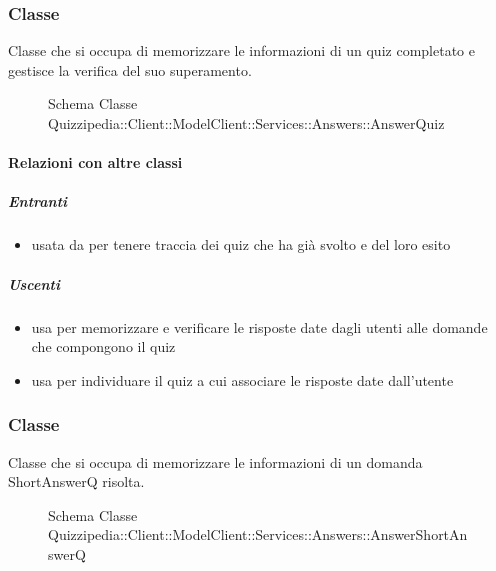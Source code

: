 \subsubsection{Classe }
Classe che si occupa di memorizzare le informazioni di un quiz completato e gestisce la verifica del suo superamento.
\begin{figure}[H]
\centering
\noindent{}
\caption[Schema Classe AnswerQuiz]{Schema Classe Quizzipedia::Client::ModelClient::Services::Answers::AnswerQuiz}
\end{figure}
\paragraph{Relazioni con altre classi}
\subparagraph{Entranti}
\begin{itemize}
\item usata da  per tenere traccia dei quiz che ha già svolto e del loro esito
\end{itemize}
\subparagraph{Uscenti}
\begin{itemize}
\item usa  per memorizzare e verificare le risposte date dagli utenti alle domande che compongono il quiz
\item usa  per individuare il quiz a cui associare le risposte date dall'utente
\end{itemize}
\subsubsection{Classe }
Classe che si occupa di memorizzare le informazioni di un domanda ShortAnswerQ risolta.
\begin{figure}[H]
\centering
\noindent{}
\caption[Schema Classe AnswerShortAnswerQ]{Schema Classe Quizzipedia::Client::ModelClient::Services::Answers::AnswerShortAnswerQ}
\end{figure}
